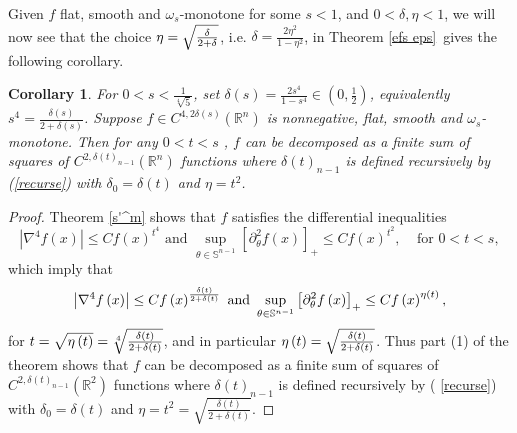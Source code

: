 \documentclass{amsart}
\theoremstyle{plain}
\newtheorem{corollary}[theorem]{Corollary}
\numberwithin{equation}{section}
\begin{document}
Given $f$ flat, smooth and $\omega _{s}$-monotone for some $s<1$, and $%
0<\delta ,\eta <1$, we will now see that the choice $\eta =\sqrt{\frac{%
\delta }{2+\delta }}$, i.e. $\delta =\frac{2\eta ^{2}}{1-\eta ^{2}}$, in
Theorem \ref{efs eps}\ gives the following corollary.

\begin{corollary}
\label{efs eps cor}For $0<s<\frac{1}{\sqrt[4]{5}}$, set $\delta \left(
s\right) =\frac{2s^{4}}{1-s^{4}}\in \left( 0,\frac{1}{2}\right) $,
equivalently $s^{4}=\frac{\delta \left( s\right) }{2+\delta \left( s\right) }
$. Suppose $f\in C^{4,2\delta \left( s\right) }\left( \mathbb{R}^{n}\right) $
is nonnegative, flat, smooth and $\omega _{s}$-monotone. Then for any $0<t<s$%
, $f$ can be decomposed as a finite sum of squares of $C^{2,\delta \left(
t\right) _{n-1}}\left( \mathbb{R}^{n}\right) $ functions where $\delta
\left( t\right) _{n-1}$ is defined recursively by (\ref{recurse}) with $%
\delta _{0}=\delta \left( t\right) $ and $\eta =t^{2}$.
\end{corollary}

\begin{proof}
Theorem \ref{s'^m} shows that $f$ satisfies the differential inequalities%
\begin{equation*}
\left\vert \nabla ^{4}f\left( x\right) \right\vert \leq Cf\left( x\right)
^{t^{4}}\text{ and }\sup_{\theta \in \mathbb{S}^{n-1}}\left[ \partial
_{\theta }^{2}f\left( x\right) \right] _{+}\leq Cf\left( x\right) ^{t^{2}},\
\ \ \ \ \text{for }0<t<s,
\end{equation*}%
which imply that 
\begin{equation*}
\left\vert \nabla ^{4}f\left( x\right) \right\vert \leq Cf\left( x\right) ^{%
\frac{\delta \left( t\right) }{2+\delta \left( t\right) }}\text{ and }%
\sup_{\theta \in \mathbb{S}^{n-1}}\left[ \partial _{\theta }^{2}f\left(
x\right) \right] _{+}\leq Cf\left( x\right) ^{\eta \left( t\right) },
\end{equation*}%
for $t=\sqrt{\eta \left( t\right) }=\sqrt[4]{\frac{\delta \left( t\right) }{%
2+\delta \left( t\right) }}$, and in particular $\eta \left( t\right) =\sqrt{%
\frac{\delta \left( t\right) }{2+\delta \left( t\right) }}$. Thus part (1)
of the theorem shows that $f$ can be decomposed as a finite sum of squares
of $C^{2,\delta \left( t\right) _{n-1}}\left( \mathbb{R}^{2}\right) $
functions where $\delta \left( t\right) _{n-1}$ is defined recursively by (%
\ref{recurse}) with $\delta _{0}=\delta \left( t\right) $ and $\eta =t^{2}=%
\sqrt{\frac{\delta \left( t\right) }{2+\delta \left( t\right) }}$.
\end{proof}
\end{document}
